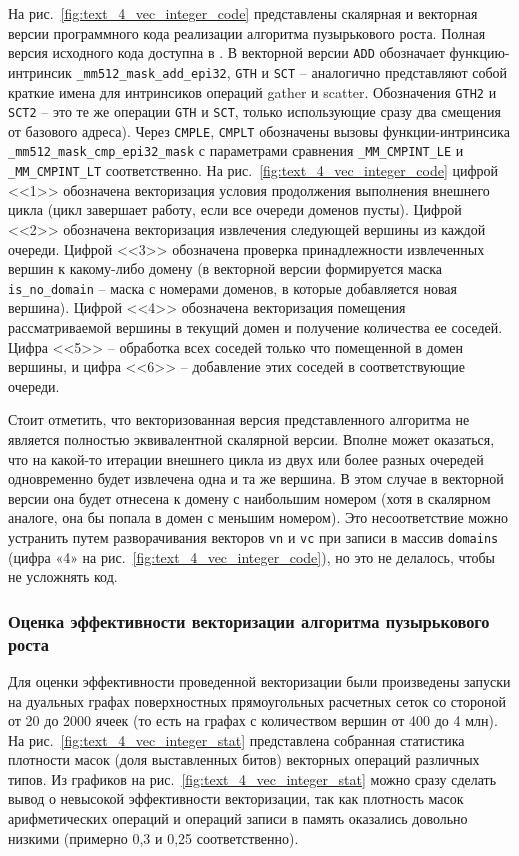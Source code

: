 На рис.~\ref{fig:text_4_vec_integer_code} представлены скалярная и векторная версии программного кода реализации алгоритма пузырькового роста.
Полная версия исходного кода доступна в \cite{comboptGithub}.
В векторной версии \texttt{ADD} обозначает функцию-интринсик\label{term:intrinsic7} \texttt{\_mm512\_mask\_add\_epi32}, \texttt{GTH} и \texttt{SCT} -- аналогично представляют собой краткие имена для интринсиков операций gather и scatter.
Обозначения \texttt{GTH2} и \texttt{SCT2} -- это те же операции \texttt{GTH} и \texttt{SCT}, только использующие сразу два смещения от базового адреса).
Через \texttt{CMPLE}, \texttt{CMPLT} обозначены вызовы функции-интринсика \texttt{\_mm512\_mask\_cmp\_epi32\_mask} с параметрами сравнения \texttt{\_MM\_CMPINT\_LE} и \texttt{\_MM\_CMPINT\_LT} соответственно.
На рис.~\ref{fig:text_4_vec_integer_code} цифрой <<1>> обозначена векторизация условия продолжения выполнения внешнего цикла (цикл завершает работу, если все очереди доменов пусты).
Цифрой <<2>> обозначена векторизация извлечения следующей вершины из каждой очереди.
Цифрой <<3>> обозначена проверка принадлежности извлеченных вершин к какому-либо домену (в векторной версии формируется маска \texttt{is\_no\_domain} -- маска с номерами доменов, в которые добавляется новая вершина).
Цифрой <<4>> обозначена векторизация помещения рассматриваемой вершины в текущий домен и получение количества ее соседей. 
Цифра <<5>> -- обработка всех соседей только что помещенной в домен вершины, и цифра <<6>> -- добавление этих соседей в соответствующие очереди.

Стоит отметить, что векторизованная версия представленного алгоритма не является полностью эквивалентной скалярной версии. 
Вполне может оказаться, что на какой-то итерации внешнего цикла из двух или более разных очередей одновременно будет извлечена одна и та же вершина.
В этом случае в векторной версии она будет отнесена к домену с наибольшим номером (хотя в скалярном аналоге, она бы попала в домен с меньшим номером).
Это несоответствие можно устранить путем разворачивания векторов \texttt{vn} и \texttt{vc} при записи в массив \texttt{domains} (цифра «4» на рис.~\ref{fig:text_4_vec_integer_code}), но это не делалось, чтобы не усложнять код.

\subsubsection{Оценка эффективности векторизации алгоритма пузырькового роста}

Для оценки эффективности проведенной векторизации были произведены запуски на дуальных графах\label{term:dual_graph4} поверхностных прямоугольных расчетных сеток со стороной от 20 до 2000 ячеек (то есть на графах с количеством вершин от 400 до 4 млн).
На рис.~\ref{fig:text_4_vec_integer_stat} представлена собранная статистика плотности масок\label{term:vector_mask_density6} (доля выставленных битов) векторных операций различных типов.
Из графиков на рис.~\ref{fig:text_4_vec_integer_stat} можно сразу сделать вывод о невысокой эффективности векторизации, так как плотность масок арифметических операций и операций записи в память оказались довольно низкими (примерно 0,3 и 0,25 соответственно).

